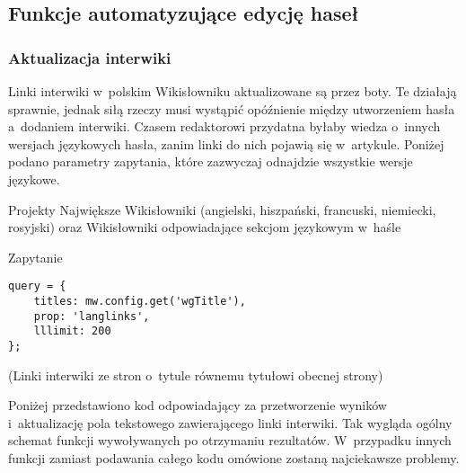 \subsection{Funkcje automatyzujące edycję haseł}

\subsubsection{Aktualizacja interwiki}
Linki interwiki w~polskim Wikisłowniku aktualizowane są przez boty. Te działają sprawnie, jednak siłą rzeczy musi wystąpić opóźnienie między utworzeniem hasła a~dodaniem interwiki. Czasem redaktorowi przydatna byłaby wiedza o~innych wersjach językowych hasła, zanim linki do nich pojawią się w~artykule. Poniżej podano parametry zapytania, które zazwyczaj odnajdzie wszystkie wersje językowe.

\begin{opis}
\item[Projekty] Największe Wikisłowniki (angielski, hiszpański, francuski, niemiecki, rosyjski) oraz Wikisłowniki odpowiadające sekcjom językowym w~haśle
\item[Zapytanie]
\begin{verbatim}
query = {
    titles: mw.config.get('wgTitle'),
    prop: 'langlinks',
    lllimit: 200
};
\end{verbatim}
(Linki interwiki ze stron o~tytule równemu tytułowi obecnej strony)
\end{opis}

Poniżej przedstawiono kod odpowiadający za przetworzenie wyników i~aktualizację pola tekstowego zawierającego linki interwiki. Tak wygląda ogólny schemat funkcji wywoływanych po otrzymaniu rezultatów. W~przypadku innych funkcji zamiast podawania całego kodu omówione zostaną najciekawsze problemy.

